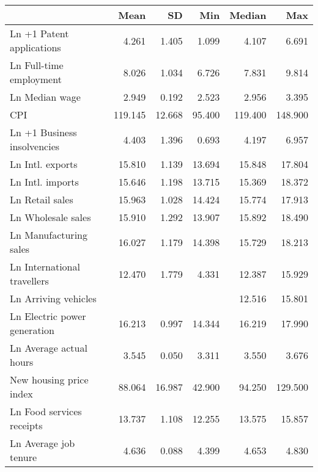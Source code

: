 
\begin{tabular}[t]{lrrrrr}
\toprule
  & Mean & SD & Min & Median & Max\\
\midrule
Ln +1 Patent applications & \num{4.261} & \num{1.405} & \num{1.099} & \num{4.107} & \num{6.691}\\
Ln Full-time employment & \num{8.026} & \num{1.034} & \num{6.726} & \num{7.831} & \num{9.814}\\
Ln Median wage & \num{2.949} & \num{0.192} & \num{2.523} & \num{2.956} & \num{3.395}\\
CPI & \num{119.145} & \num{12.668} & \num{95.400} & \num{119.400} & \num{148.900}\\
Ln +1 Business insolvencies & \num{4.403} & \num{1.396} & \num{0.693} & \num{4.197} & \num{6.957}\\
Ln Intl. exports & \num{15.810} & \num{1.139} & \num{13.694} & \num{15.848} & \num{17.804}\\
Ln Intl. imports & \num{15.646} & \num{1.198} & \num{13.715} & \num{15.369} & \num{18.372}\\
Ln Retail sales & \num{15.963} & \num{1.028} & \num{14.424} & \num{15.774} & \num{17.913}\\
Ln Wholesale sales & \num{15.910} & \num{1.292} & \num{13.907} & \num{15.892} & \num{18.490}\\
Ln Manufacturing sales & \num{16.027} & \num{1.179} & \num{14.398} & \num{15.729} & \num{18.213}\\
Ln International travellers & \num{12.470} & \num{1.779} & \num{4.331} & \num{12.387} & \num{15.929}\\
Ln Arriving vehicles &  &  &  & \num{12.516} & \num{15.801}\\
Ln Electric power generation & \num{16.213} & \num{0.997} & \num{14.344} & \num{16.219} & \num{17.990}\\
Ln Average actual hours & \num{3.545} & \num{0.050} & \num{3.311} & \num{3.550} & \num{3.676}\\
New housing price index & \num{88.064} & \num{16.987} & \num{42.900} & \num{94.250} & \num{129.500}\\
Ln Food services receipts & \num{13.737} & \num{1.108} & \num{12.255} & \num{13.575} & \num{15.857}\\
Ln Average job tenure & \num{4.636} & \num{0.088} & \num{4.399} & \num{4.653} & \num{4.830}\\
\bottomrule
\end{tabular}
